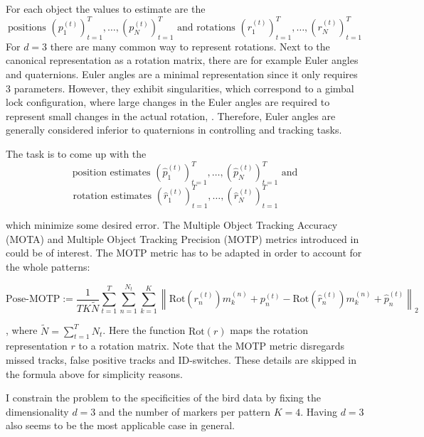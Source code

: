 \documentclass[12pt,a4paper]{article}
\begin{document}
For each object the values to estimate are the 
$$ \text{positions } \left(p^{(t)}_1\right)_{t=1}^T, \dots,\left(p^{(t)}_N\right)_{t=1}^T \text{ and rotations } \left(r^{(t)}_1\right)_{t=1}^T, \dots,\left(r^{(t)}_N\right)_{t=1}^T$$ 
For $d=3$ there are many common way to represent rotations. Next to the canonical representation as a rotation matrix, there are for example Euler angles and quaternions. Euler angles are a minimal representation since it only requires 3 parameters. However, they exhibit singularities, which correspond to a gimbal lock configuration, where large changes in the Euler angles are required to represent small changes in the actual rotation, \cite{manifolds}. Therefore, Euler angles are generally considered inferior to quaternions in controlling and tracking tasks. 

The task is to come up with the $$ \text{ position estimates } \left(\hat{p}^{(t)}_1\right)_{t=1}^T, \dots,\left(\hat{p}^{(t)}_N\right)_{t=1}^T \text{ and }$$ $$\text{ rotation estimates } \left(\hat{r}^{(t)}_1\right)_{t=1}^T, \dots,\left(\hat{r}^{(t)}_N\right)_{t=1}^T \qquad ~$$ 
\begin{sloppypar}
which minimize some desired error. The Multiple Object Tracking Accuracy (MOTA) and Multiple Object Tracking Precision (MOTP) metrics introduced in \cite{mot_metrics} could be of interest. The MOTP metric has to be adapted in order to account for the whole patterns:
\end{sloppypar}

\begin{equation}
	\text{Pose-MOTP} := \frac{1}{TK\tilde{N}}\sum_{t=1}^{T}\sum_{n=1}^{N_t} \sum_{k=1}^{K} \left\| \text{Rot}(r^{(t)}_n)m^{(n)}_k + p^{(t)}_n - \text{Rot}(\hat{r}^{(t)}_n)m^{(n)}_k + \hat{p}^{(t)}_n \right\|_2
\end{equation}

, where $\tilde{N}= \sum_{t=1}^{T}N_t$. Here the function $\text{Rot}(r)$ maps the rotation representation $r$ to a rotation matrix. Note that the MOTP metric disregards missed tracks, false positive tracks and ID-switches. These details are skipped in the formula above for simplicity reasons.

I constrain the problem to the specificities of the bird data by fixing the dimensionality $d=3$ and the number of markers per pattern $K=4$. Having $d=3$ also seems to be the most applicable case in general.
\end{document}
